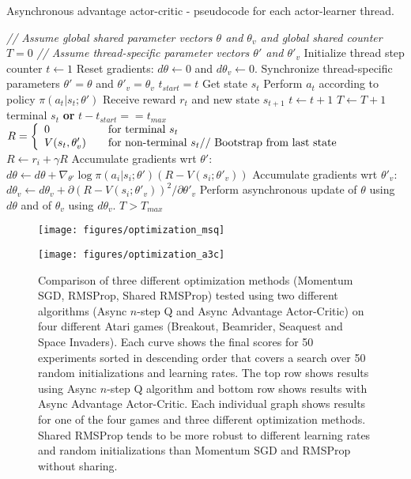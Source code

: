 \documentclass{article} \usepackage{times}
\begin{document}
\begin{algorithm}[h]
\caption{Asynchronous advantage actor-critic - pseudocode for each actor-learner thread.}
\begin{algorithmic}
\small
\State \emph{// Assume global shared parameter vectors $\theta$ and $\theta_v$ and global shared counter $T=0$}
\State \emph{// Assume thread-specific parameter vectors $\theta'$ and $\theta'_v$}
\State Initialize thread step counter $t\gets 1$
\Repeat
\State Reset gradients: $d\theta \gets 0$ and $d\theta_v \gets 0$.
\State Synchronize thread-specific parameters  $\theta'=\theta$ and $\theta'_v=\theta_v$ \State $t_{start} = t$
\State Get state $s_t$
\Repeat
\State Perform $a_t$ according to policy $\pi (a_t|s_t;\theta')$
\State Receive reward $r_t$ and new state $s_{t+1}$
\State $t \gets t + 1$
\State $T \gets T + 1$
\Until terminal $s_t$ \textbf{or} $t-t_{start}==t_{max}$
\State $R =
    \left\{
    \begin{array}{l l}
      0  \quad & \text{for terminal } s_t\\
        V(s_t,\theta'_v) \quad & \text{for non-terminal } s_t \text{// Bootstrap from last state}
    \end{array}\right.$
\State $R \gets r_i + \gamma R$
\State Accumulate gradients wrt $\theta'$: $d\theta \gets d\theta + \nabla_{\theta'} \log\pi(a_i|s_i;\theta') (R - V(s_i;\theta'_v))$
\State Accumulate gradients wrt $\theta'_v$: $d\theta_v \gets d\theta_v + {\partial\left(R - V(s_i;\theta'_v)\right)^2}/{\partial \theta'_v}$
\EndFor
\State Perform asynchronous update of $\theta$ using $d\theta$ and of $\theta_v$ using $d\theta_v$.
\Until $T > T_{max}$
\end{algorithmic}
\label{alg:reinforce}
\end{algorithm}

\clearpage

\clearpage

\begin{figure}[t]
\begin{center}
\centerline{\texttt{[image: figures/optimization\_msq]}}
\centerline{\texttt{[image: figures/optimization\_a3c]}}
\caption{\label{fig-optimization} Comparison of three different optimization methods (Momentum SGD, RMSProp, Shared RMSProp) tested using two different algorithms (Async $n$-step Q and Async Advantage Actor-Critic) on four different Atari games (Breakout, Beamrider, Seaquest and Space Invaders). Each curve shows the final scores for 50 experiments sorted in descending order that covers a search over 50 random initializations and learning rates. The top row shows results using Async $n$-step Q algorithm and bottom row shows results with Async Advantage Actor-Critic. Each individual graph shows results for one of the four games and three different optimization methods. Shared RMSProp tends to be more robust to different learning rates and random initializations than Momentum SGD and RMSProp without sharing.}
\vspace{-0.5cm}
\end{center}
\end{figure}
\end{document}
